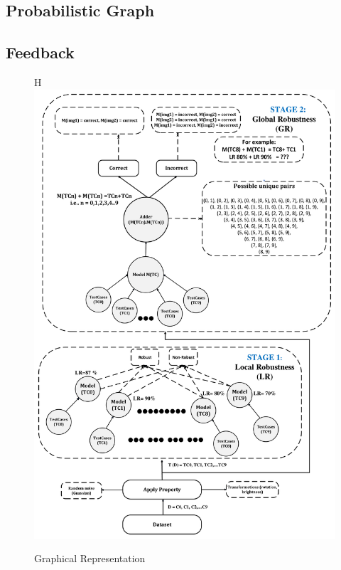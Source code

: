 \documentclass[10pt, conference, a4paper, final]{IEEEtran}
\begin{document}
\subsection {Probabilistic Graph}
\subsection {Feedback}
  

\begin{figure}{H}
    \centering
    \includegraphics[width=\linewidth]{paper_images/addermodelview.pdf}
    \caption{Graphical Representation}
    \label{fig:graph}
\end{figure}
\end{document}
